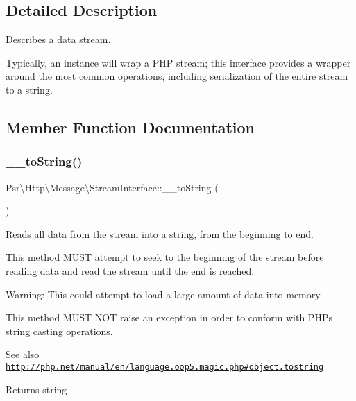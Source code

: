 \subsection{Detailed Description}
Describes a data stream.

Typically, an instance will wrap a P\+HP stream; this interface provides a wrapper around the most common operations, including serialization of the entire stream to a string. 

\subsection{Member Function Documentation}
\mbox{\label{interfacePsr_1_1Http_1_1Message_1_1StreamInterface_a72df4e8851ae1a81087f3415fd6d73cd}} 
\subsubsection{\texorpdfstring{\+\_\+\+\_\+to\+String()}{\_\_toString()}}
{\footnotesize\ttfamily Psr\textbackslash{}\+Http\textbackslash{}\+Message\textbackslash{}\+Stream\+Interface\+::\+\_\+\+\_\+to\+String (\begin{DoxyParamCaption}{ }\end{DoxyParamCaption})}

Reads all data from the stream into a string, from the beginning to end.

This method M\+U\+ST attempt to seek to the beginning of the stream before reading data and read the stream until the end is reached.

Warning\+: This could attempt to load a large amount of data into memory.

This method M\+U\+ST N\+OT raise an exception in order to conform with P\+HP\textquotesingle{}s string casting operations.

\begin{DoxySeeAlso}{See also}
\href{http://php.net/manual/en/language.oop5.magic.php#object.tostring}{\tt http\+://php.\+net/manual/en/language.\+oop5.\+magic.\+php\#object.\+tostring} 
\end{DoxySeeAlso}
\begin{DoxyReturn}{Returns}
string 
\end{DoxyReturn}


